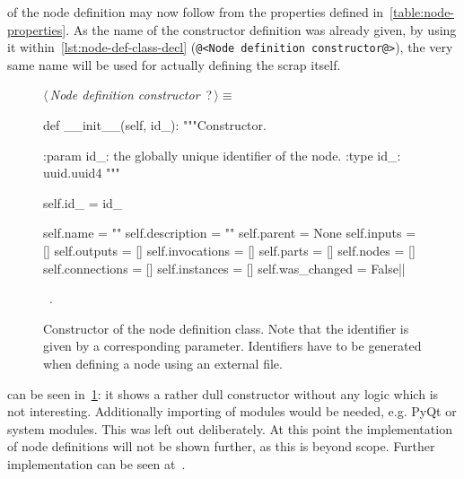 \documentclass[%
    a4paper,    %
    justified,  %
    nobib,      %
    openany     %
]{tufte-book}
\begin{document}
 of the node definition may now follow
from the properties defined in~\autoref{table:node-properties}. As the name of
the constructor definition was already given, by using it
within~\autoref{lst:node-def-class-decl}
(\verb|@<Node definition constructor@>|), the very same name will be used for
actually defining the scrap itself.

\begin{figure}[!htbp]
  \begin{flushleft} \small
\begin{minipage}{\linewidth}\label{scrap2}\raggedright\small
{} $\langle\,${\itshape Node definition constructor}\nobreak\ {\footnotesize {?}}$\,\rangle\equiv$
\vspace{-1ex}
\begin{pythoncode}
def __init__(self, id_):
    """Constructor.

    :param id_: the globally unique identifier of the node.
    :type  id_: uuid.uuid4
    """

    self.id_         = id_

    self.name        = ""
    self.description = ""
    self.parent      = None
    self.inputs      = []
    self.outputs     = []
    self.invocations = []
    self.parts       = []
    self.nodes       = []
    self.connections = []
    self.instances   = []
    self.was_changed = False|\NWsep|
\end{pythoncode}
\vspace{1.5ex}
\footnotesize
\begin{list}{}{\setlength{\itemsep}{-\parsep}\setlength{\itemindent}{-\leftmargin}}
\item \NWtxtMacroRefIn\ .

\item{}
\end{list}
\end{minipage}\vspace{4ex}
\end{flushleft}
\caption{Constructor of the node definition class. Note that the
    identifier is given by a corresponding parameter. Identifiers have to be
    generated when defining a node using an external file.}
  \label{lst:node-def-constructor}
\end{figure}

 can be seen
in~\cref{lst:node-def-constructor}: it shows a rather dull constructor without
any logic which is not interesting. Additionally importing of modules would be
needed, e.g. PyQt or system modules. This was left out deliberately. At this
point the implementation of node definitions will not be shown further, as this
is beyond scope. Further implementation can be seen at~.
\end{document}
